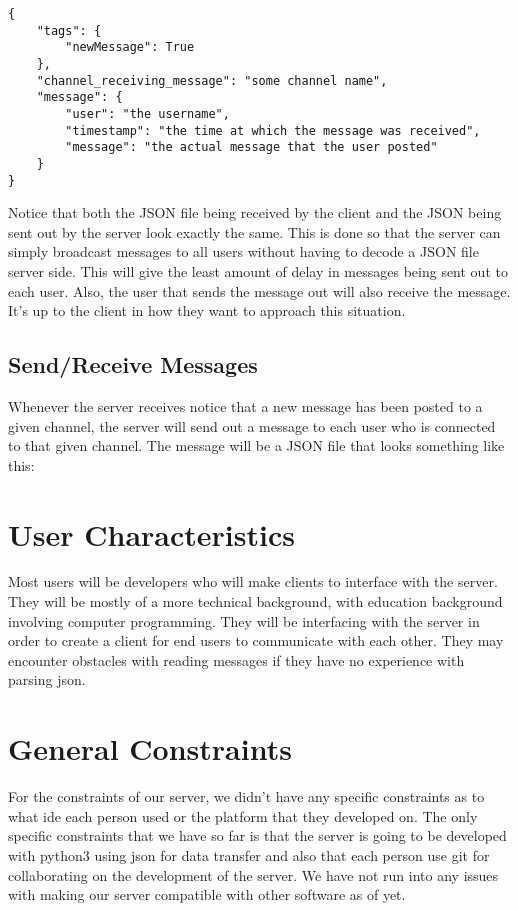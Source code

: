 \begin{lstlisting}[style=json]
{
    "tags": {
        "newMessage": True
    },
    "channel_receiving_message": "some channel name",
    "message": {
        "user": "the username",
        "timestamp": "the time at which the message was received",
        "message": "the actual message that the user posted"
    }
}
\end{lstlisting}

Notice that both the JSON file being received by the client and the JSON being sent out by the server look exactly the same. This is done so that the server can simply broadcast messages to all users without having to decode a JSON file server side. This will give the least amount of delay in messages being sent out to each user. Also, the user that sends the message out will also receive the message. It's up to the client in how they want to approach this situation.

\subsection{Send/Receive Messages}
Whenever the server receives notice that a new message has been posted to a given channel, the server will send out a message to each user who is connected to that given channel. The message will be a JSON file that looks something like this:


\section{User Characteristics}\label{user-characteristics}
Most users will be developers who will make clients to interface with
the server. They will be mostly of a more technical background, with
education background involving computer programming. They will be
interfacing with the server in order to create a client for end users to
communicate with each other. They may encounter obstacles with reading
messages if they have no experience with parsing \gls{json}.

\section{General Constraints}\label{general-constraints}
For the constraints of our server, we didn't have any specific
constraints as to what \acrfull{ide} each person used or the platform that they
developed on. The only specific constraints that we have so far is that
the server is going to be developed with \gls{python}3 using \gls{json} for data
transfer and also that each person use \gls{git} for collaborating on the
development of the server. We have not run into any issues with making
our server compatible with other software as of yet.

